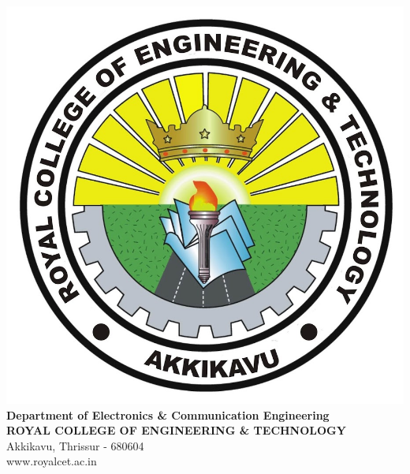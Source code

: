 \begin{center}
\vspace*{1cm}
\includegraphics[scale=0.12]{logo.jpg}\\[-0.5cm]
\Large{\textbf{Department of Electronics \& Communication
Engineering}}\\
\Large{\textbf{ROYAL COLLEGE OF ENGINEERING \& TECHNOLOGY}}\\
\large{Akkikavu, Thrissur - 680604}\\
\large{www.royalcet.ac.in}








\end{center}


